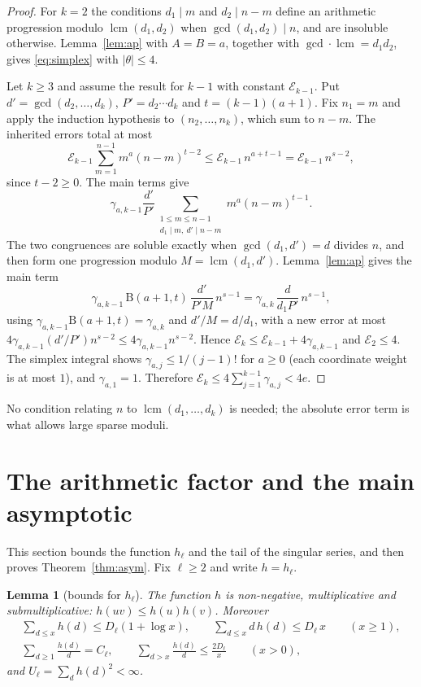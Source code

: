 \documentclass[11pt,a4paper]{article}
\newtheorem{lemma}[theorem]{Lemma}
\theoremstyle{remark}
\numberwithin{equation}{section}
\newcommand{\lcm}{\operatorname{lcm}}
\begin{document}
\begin{proof}
For $k=2$ the conditions $d_1\mid m$ and $d_2\mid n-m$ define an arithmetic progression modulo $\lcm(d_1,d_2)$ when $\gcd(d_1,d_2)\mid n$, and are insoluble otherwise. Lemma~\ref{lem:ap} with $A=B=a$, together with $\gcd\cdot\lcm=d_1d_2$, gives \eqref{eq:simplex} with $|\theta|\le4$.

Let $k\ge3$ and assume the result for $k-1$ with constant $\mathcal E_{k-1}$. Put $d'=\gcd(d_2,\ldots,d_k)$, $P'=d_2\cdots d_k$ and $t=(k-1)(a+1)$. Fix $n_1=m$ and apply the induction hypothesis to $(n_2,\dots,n_k)$, which sum to $n-m$. The inherited errors total at most
\[
\mathcal E_{k-1}\sum_{m=1}^{n-1}m^a(n-m)^{t-2}\le\mathcal E_{k-1}\,n^{a+t-1}=\mathcal E_{k-1}\,n^{s-2},
\]
since $t-2\ge0$. The main terms give
\[
\gamma_{a,k-1}\frac{d'}{P'}\sum_{\substack{1\le m\le n-1\\ d_1\mid m,\ d'\mid n-m}}m^a(n-m)^{t-1}.
\]
The two congruences are soluble exactly when $\gcd(d_1,d')=d$ divides $n$, and then form one progression modulo $M=\lcm(d_1,d')$. Lemma~\ref{lem:ap} gives the main term
\[
\gamma_{a,k-1}\,\mathrm B(a+1,t)\,\frac{d'}{P'M}\,n^{s-1}=\gamma_{a,k}\,\frac{d}{d_1P'}\,n^{s-1},
\]
using $\gamma_{a,k-1}\mathrm B(a+1,t)=\gamma_{a,k}$ and $d'/M=d/d_1$, with a new error at most $4\gamma_{a,k-1}(d'/P')n^{s-2}\le4\gamma_{a,k-1}n^{s-2}$. Hence $\mathcal E_k\le\mathcal E_{k-1}+4\gamma_{a,k-1}$ and $\mathcal E_2\le4$. The simplex integral shows $\gamma_{a,j}\le1/(j-1)!$ for $a\ge0$ (each coordinate weight is at most $1$), and $\gamma_{a,1}=1$. Therefore $\mathcal E_k\le4\sum_{j=1}^{k-1}\gamma_{a,j}<4e$.
\end{proof}

No condition relating $n$ to $\lcm(d_1,\dots,d_k)$ is needed; the absolute error term is what allows large sparse moduli.

\section{The arithmetic factor and the main asymptotic}\label{sec:factor}

This section bounds the function $h_\ell$ and the tail of the singular series, and then proves Theorem~\ref{thm:asym}. Fix $\ell\ge2$ and write $h=h_\ell$.

\begin{lemma}[bounds for $h_\ell$]\label{lem:h}
The function $h$ is non-negative, multiplicative and submultiplicative: $h(uv)\le h(u)h(v)$. Moreover
\begin{gather}
\sum_{d\le x}h(d)\le D_\ell(1+\log x),\qquad \sum_{d\le x}d\,h(d)\le D_\ell\,x\qquad(x\ge1),\label{eq:h1}\\
\sum_{d\ge1}\frac{h(d)}d=C_\ell,\qquad \sum_{d>x}\frac{h(d)}d\le\frac{2D_\ell}{x}\qquad(x>0),\label{eq:h2}
\end{gather}
and $U_\ell=\sum_dh(d)^2<\infty$.
\end{lemma}
\end{document}
